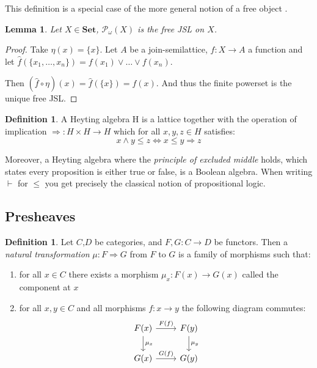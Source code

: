\documentclass[12pt]{article}
\newtheorem{lemma}[theorem]{Lemma}
\theoremstyle{definition}
\newtheorem{definition}[theorem]{Definition}
\newcommand{\1}{\mathbbm{1}}
\newcommand{\finP}{\mathcal{P}_{\omega}}
\newcommand{\Set}{\mathbf{Set}}
\begin{document}
This definition is a special case of the more general notion of a free object \cite{nlab:free_object}.

\begin{lemma}\label{lem:free_jsl}
    Let $X\in \Set$, $\finP(X)$ is the free JSL on $X$.
\end{lemma}

\begin{proof}
    Take $\eta(x) = \{x\}$. Let $A$ be a join-semilattice, $f: X \to A$ a function and let $\hat{f}(\{x_1, \dots, x_n\}) = f(x_1)\vee \dots \vee f(x_n)$.\

    Then $(\hat{f}\circ \eta)(x) = \hat{f}(\{x\}) = f(x)$. And thus the finite powerset is the unique free JSL.
\end{proof}

\begin{definition}
    A Heyting algebra H is a lattice together with the operation of implication $\Rightarrow: H\times H \to H$ which for all $x,y,z\in H$ satisfies:
    \[
        x\wedge y \leq z \iff x\leq y\Rightarrow z
    \]
\end{definition}

Moreover, a Heyting algebra where the \emph{principle of excluded middle} holds, which states every proposition is either true or false, is a Boolean algebra. When writing $\vdash$ for $\leq$ you get precisely the classical notion of propositional logic.

\subsection{Presheaves}
\begin{definition}
    Let $C$,$D$ be categories, and $F,G: C\to D$ be functors. Then a \emph{natural transformation} $\mu: F\Rightarrow G$ from $F$ to $G$ is a family of morphisms such that:
    \begin{enumerate}
        \item for all $x\in C$ there exists a morphism $\mu_x: F(x)\to G(x)$ called the component at $x$
        \item for all $x,y\in C$ and all morphisms $f: x\to y$ the following diagram commutes:
        \begin{equation}\label{eq:nat-trans}
            \begin{tikzcd}
                F(x) \arrow{r}{F(f)} \arrow{d}{\mu_x} & F(y) \arrow{d}{\mu_y} \\
                G(x) \arrow{r}{G(f)} & G(y)
            \end{tikzcd}
        \end{equation}
    \end{enumerate}
\end{definition}
\end{document}
